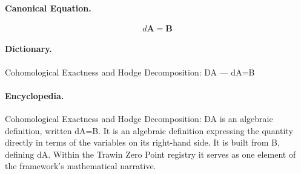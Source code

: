 \paragraph{Canonical Equation.}
\[
d\mathbf{A}=\mathbf{B}
\]

\paragraph{Dictionary.}
Cohomological Exactness and Hodge Decomposition: DA — dA=B

\paragraph{Encyclopedia.}
Cohomological Exactness and Hodge Decomposition: DA is an algebraic definition, written dA=B. It is an algebraic definition expressing the quantity directly in terms of the variables on its right-hand side. It is built from B, defining dA. Within the Trawin Zero Point registry it serves as one element of the framework's mathematical narrative.
